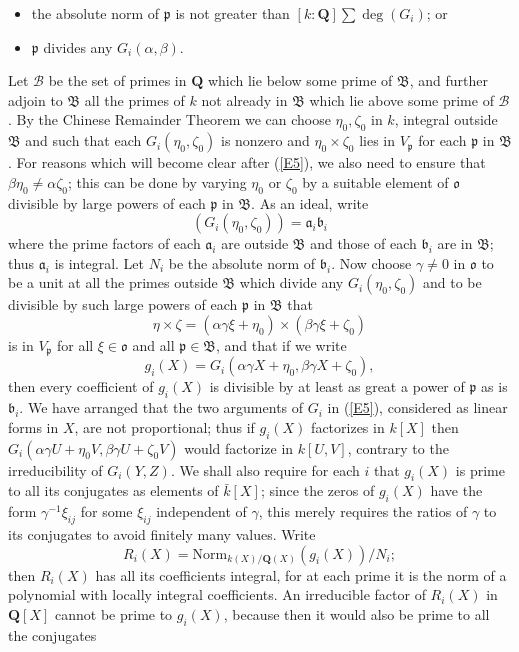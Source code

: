 \documentclass[12pt]{article}
\def\bQ{{\mathbf Q}}
\def\fa{{\mathfrak a}}
\def\fb{{\mathfrak b}}
\def\fB{{\mathfrak B}}
\def\fo{{\mathfrak o}}
\def\fp{{\mathfrak p}}
\def\ga{{\alpha}}
\def\gb{{\beta}}
\def\gg{{\gamma}}
\def\sB{{\mathcal B}}
\def\beq{\begin{equation} \label}
\begin{document}
\begin{itemize}
\item the absolute norm of $\fp$ is not greater than $[k:\bQ]\sum\deg(G_i)$; or
\item $\fp$ divides any $G_i(\ga,\gb)$.
\end{itemize}
Let $\sB$ be the set of primes in $\bQ$ which lie below some prime of
$\fB$, and further adjoin to $\fB$ all the primes of $k$ not already in $\fB$
which lie above some prime of $\sB$.
By the Chinese Remainder Theorem we can choose $\eta_0,\zeta_0$ in $k$,
integral outside $\fB$ and such that each $G_i(\eta_0,\zeta_0)$ is nonzero
and $\eta_0\times\zeta_0$ lies in $V_\fp$ for each $\fp$ in $\fB$. For
reasons which will become clear after (\ref{E5}), we also
need to ensure that $\gb\eta_0\neq\ga\zeta_0$; this can be
done by varying
$\eta_0$ or $\zeta_0$ by a suitable element of $\fo$ divisible by large powers
of each $\fp$ in $\fB$. As an ideal, write
\[ (G_i(\eta_0,\zeta_0))=\fa_i\fb_i \]
where the prime factors of each $\fa_i$ are outside $\fB$ and those of each
$\fb_i$ are in $\fB$; thus $\fa_i$ is integral. Let $N_i$ be the absolute norm
of $\fb_i$. Now choose $\gg\neq0$ in $\fo$ to be a unit at all the primes
outside $\fB$ which divide any $G_i(\eta_0,\zeta_0)$ and
to be divisible by such large powers of each $\fp$ in $\fB$
that
\[ \eta\times\zeta=(\ga\gg\xi+\eta_0)\times(\gb\gg\xi+\zeta_0) \]
is in $V_\fp$ for all $\xi\in\fo$ and all $\fp\in\fB$, and that
if we write
\beq{E5} g_i(X)=G_i(\ga\gg X+\eta_0,\gb\gg X+\zeta_0), \end{equation}
then every coefficient of $g_i(X)$ is divisible by at least as great a power
of $\fp$ as is $\fb_i$. We have arranged that the two arguments of $G_i$ in
(\ref{E5}), considered as linear forms in $X$, are not proportional; thus if
$g_i(X)$ factorizes in $k[X]$ then $G_i(\ga\gg U
+\eta_0V,\gb\gg U+\zeta_0V)$ would factorize in $k[U,V]$, contrary to the
irreducibility of $G_i(Y,Z)$. We shall also require for each $i$ that $g_i(X)$
is prime to all its conjugates as elements of $\bar{k}[X]$; since the zeros
of $g_i(X)$ have the form $\gg^{-1}\xi_{ij}$ for some $\xi_{ij}$ independent
of $\gg$, this merely requires the ratios of $\gg$ to its conjugates to avoid
finitely many values. Write
\[ R_i(X)={\mathrm{Norm}}_{k(X)/\bQ(X)}(g_i(X))/N_i; \] 
then $R_i(X)$ has all its coefficients integral, for at each prime
it is the norm of a polynomial with locally integral coefficients.
An irreducible factor of $R_i(X)$ in $\bQ[X]$ cannot be prime to 
$g_i(X)$, because then it would also be prime to all the conjugates
\end{document}
